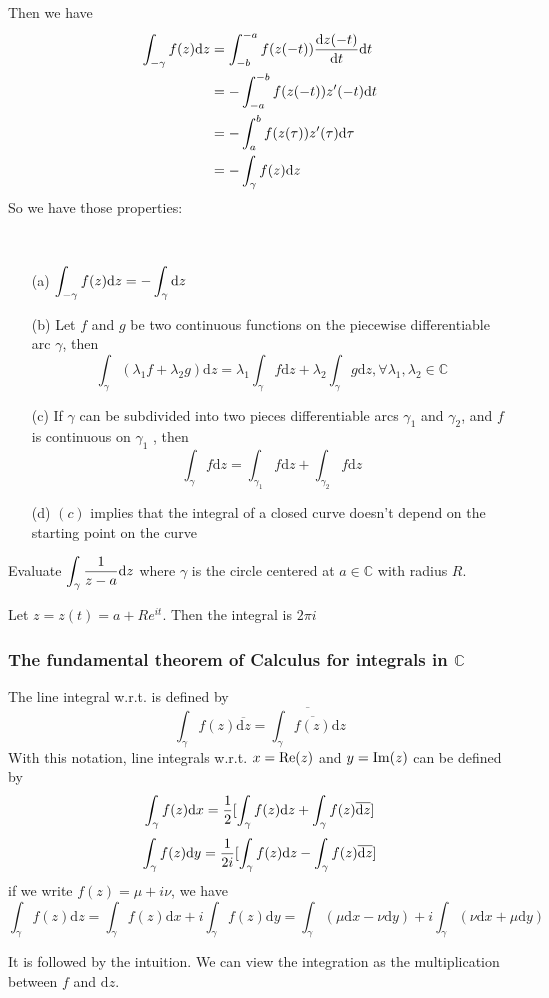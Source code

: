 Then we have 
\begin{align*}
    \int_{-\gamma}f(z)\mathrm{d}z&=\int_{-b}^{-a}f(z(-t))\displaystyle\frac{\mathrm{d}z(-t)}{\mathrm{d}t}\mathrm{d}t\\
    &=-\int_{-a}^{-b}f(z(-t))z'(-t)\mathrm{d}t\\
    &=-\int_{a}^bf(z(\tau))z'(\tau)\mathrm{d}\tau\\
    &=-\int_\gamma f(z)\mathrm{d}z
\end{align*}
So we have those properties:
\begin{proposition}
    \,
    \begin{enumerate}
        \item[(a)]  $ \displaystyle\int_{-\gamma}f(z)\mathrm{d}z=-\int_\gamma\mathrm{d}z $
        \item[(b)] Let  $ f $ and  $ g $ be two continuous functions on the piecewise differentiable arc  $ \gamma $, then 
        \[\int_\gamma(\lambda_1f+\lambda_2g)\mathrm{d}z=\lambda_1\int_\gamma f\mathrm{d}z+\lambda_2\int_\gamma g\mathrm{d}z,\forall \lambda_1,\lambda_2\in\mathbb{C}\]      
        \item[(c)] If  $ \gamma $ can be subdivided into two pieces differentiable arcs  $ \gamma_1 $ and  $ \gamma_2 $, and  $ f $ is continuous on  $ \gamma_1 $ , then
        \[\int_\gamma f\mathrm{d}z=\int_{\gamma_1} f\mathrm{d}z+\int_{\gamma_2} f\mathrm{d}z\]
        \item[(d)]  $ (c) $ implies that the integral of a closed curve doesn't depend on the starting point on the curve 
    \end{enumerate}
\end{proposition}
\begin{example}
    Evaluate  $ \displaystyle\int_\gamma\frac{1}{z-a}\mathrm{d}z $ where  $ \gamma $ is the circle centered at  $ a\in\mathbb{C} $ with radius  $ R $. 
    
    Let  $ z=z(t)=a+Re^{it} $. Then the integral is  $ 2\pi i $  
\end{example}
\subsubsection{The fundamental theorem of Calculus for integrals in  $ \mathbb{C} $}
The line integral w.r.t.   is defined by 
\[\int_\gamma f(z)\overline{\mathrm{d}{z}}=\overline{\int_\gamma \overline{f(z)}\mathrm{d}z} \] 
With this notation, line integrals w.r.t.  $ x=\mathrm{Re}(z) $ and  $ y=\mathrm{Im}(z) $ can be defined by 
\[\int_\gamma f(z)\mathrm{d}x=\displaystyle\frac{1}{2}[\int_\gamma f(z)\mathrm{d}z+\int_\gamma f(z)\overline{\mathrm{d}z}]\]
\[\int_\gamma f(z)\mathrm{d}y=\displaystyle\frac{1}{2 i}[\int_\gamma f(z)\mathrm{d}z-\int_\gamma f(z)\overline{\mathrm{d}z}]\]
if we write  $ f(z)=\mu+i\nu $, we have 
\[\int_\gamma f(z)\mathrm{d}z=\int_\gamma f(z)\mathrm{d}x+i\int_\gamma f(z)\mathrm{d}y=\int_\gamma(\mu\mathrm{d}x-\nu\mathrm{d}y)+i\int_\gamma(\nu\mathrm{d}x+\mu\mathrm{d}y)\]   
\begin{remark}
    It is followed by the intuition. We can view the integration as the multiplication between  $ f $ and  $ \mathrm{d}z $. 
\end{remark}

